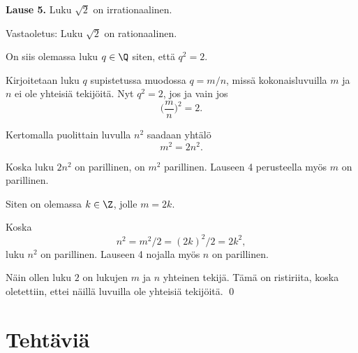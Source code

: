 {\bf Lause 5.} Luku $\sqrt{2}$ on irrationaalinen.

\proof
Vastaoletus: Luku $\sqrt{2}$ on rationaalinen.

On siis olemassa luku $q\in \Q$ siten, että $q^2=2$.

Kirjoitetaan luku $q$ supistetussa muodossa $q=m/n$, missä kokonaisluvuilla $m$ ja $n$ ei ole yhteisiä tekijöitä. Nyt $q^2=2$, jos ja vain jos
\[
\bigg(\frac{m}{n}\bigg)^2=2.
\]

Kertomalla puolittain luvulla $n^2$ saadaan yhtälö
\[
m^2 = 2n^2.
\]

Koska luku $2n^2$ on parillinen, on $m^2$ parillinen. Lauseen 4 perusteella myös $m$ on parillinen.

Siten on olemassa $k\in \Z$, jolle $m=2k$.

Koska
\[
n^2=m^2/2=(2k)^2/2= 2k^2,
\]
luku $n^2$ on parillinen. Lauseen 4 nojalla myös $n$ on parillinen.

Näin ollen luku $2$ on lukujen $m$ ja $n$ yhteinen tekijä. Tämä on ristiriita, koska oletettiin, ettei näillä luvuilla ole yhteisiä tekijöitä.
\qed

\newpage




\section*{Tehtäviä}

